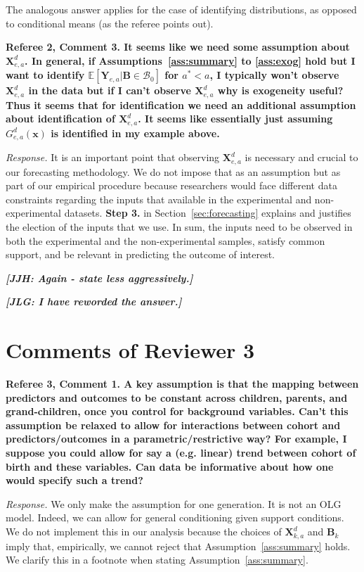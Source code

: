 The analogous answer applies for the case of identifying distributions, as opposed to conditional means (as the referee points out).

\noindent \textbf{Referee 2, Comment 3. It seems like we need some assumption about $\bm{X}_{e,a}^d$. In general, if Assumptions~\ref{ass:summary} to \ref{ass:exog} hold but I want to identify $\mathbb{E} \left[ \bm{Y}_{e,a} | \bm{B} \in \mathcal{B}_0 \right]$ for $a^* < a$, I typically won't observe $\bm{X}_{e,a}^d$ in the data but if I can't observe $\bm{X}_{e,a}^d$ why is exogeneity useful? Thus it seems that for identification we need an additional assumption about identification of $\bm{X}_{e,a}^d$. It seems like essentially just assuming $G_{e,a}^d \left( \bm{x} \right)$ is identified in my example above.} 

\noindent \textit{Response.} It is an important point that observing $\bm{X}_{e,a}^d$ is necessary and crucial to our forecasting methodology. We do not impose that as an assumption but as part of our empirical procedure because researchers would face different data constraints regarding the inputs that available in the experimental and non-experimental datasets. \textbf{Step 3.} in Section~\ref{sec:forecasting} explains and justifies the election of the inputs that we use. In sum, the inputs need to be observed in both the experimental and the non-experimental samples, satisfy common support, and be relevant in predicting the outcome of interest. 

\textbf{\textit{[JJH: Again - state less aggressively.]}}

\textbf{\textit{[JLG: I have reworded the answer.]}}

\section*{Comments of Reviewer 3}

\noindent \textbf{Referee 3, Comment 1. A key assumption is that the mapping between predictors and outcomes to be constant across children, parents, and grand-children, once you control for background variables. Can't this assumption be relaxed to allow for interactions between cohort and predictors/outcomes in a parametric/restrictive way? For example, I suppose you could allow for say a (e.g. linear) trend between cohort of birth and these variables. Can data be informative about how one would specify such a trend?}

\noindent \textit{Response.} We only make the assumption for one generation. It is not an OLG model. Indeed, we can allow for general conditioning given support conditions. We do not implement this in our analysis because the choices of $\bm{X}_{k,a}^d$ and $\bm{B}_k$ imply that, empirically, we cannot reject that Assumption~\ref{ass:summary} holds. We clarify this in a footnote when stating Assumption~\ref{ass:summary}.

